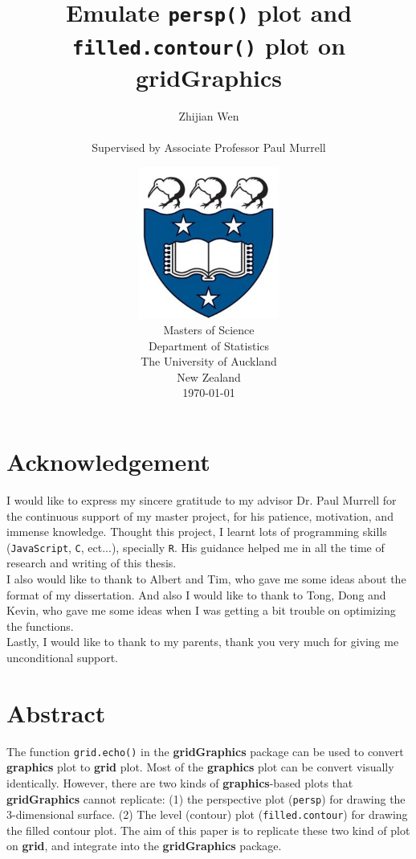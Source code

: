 \documentclass[11pt]{report}
\title{\huge{Emulate \texttt{persp()} plot and \texttt{filled.contour()} plot on \textbf{gridGraphics}}}
\author{\Large{Zhijian Wen} \\ \\ \Large{Supervised by Associate Professor Paul Murrell}}
\date
{
\vspace{3cm}
\includegraphics[height = 5cm, width = 5cm]{logo.jpg}\\
\vspace{1cm}
Masters of Science\\
Department of Statistics\\
The University of Auckland\\
New Zealand\\
\today\\
}
\begin{document}

\setlength{\parindent}{1pt}
\noindent

\maketitle
\tableofcontents
\listoffigures

\newpage
\pagebreak
\hspace{0pt}
\vfill
\section*{Acknowledgement}
I would like to express my sincere gratitude to my advisor Dr. Paul Murrell for the continuous support of my master project, for his patience, motivation, and immense knowledge. Thought this project, I learnt lots of programming skills (\texttt{JavaScript}, \texttt{C}, ect...), specially \texttt{R}. His guidance helped me in all the time of research and writing of this thesis.\\

I also would like to thank to Albert and Tim, who gave me some ideas about the format of my dissertation. And also I would like to thank to Tong, Dong and Kevin, who gave me some ideas when I was getting a bit trouble on optimizing the functions.\\

Lastly, I would like to thank to my parents, thank you very much for giving me unconditional support. 
\vfill
\hspace{0pt}
\pagebreak

\newpage
\pagebreak
\hspace{0pt}
\vfill
\section*{Abstract}
The function \texttt{grid.echo()} in the \textbf{gridGraphics} package can be used to convert \textbf{graphics} plot to \textbf{grid} plot. Most of the \textbf{graphics} plot can be convert visually identically. However, there are two kinds of \textbf{graphics}-based plots that \textbf{gridGraphics} cannot replicate: (1) the perspective plot (\texttt{persp}) for drawing the 3-dimensional surface. (2) The level (contour) plot (\texttt{filled.contour}) for drawing the filled contour plot. The aim of this paper is to replicate these two kind of plot on \textbf{grid}, and integrate into the \textbf{gridGraphics} package.
\vfill
\hspace{0pt}
\pagebreak
\end{document}
